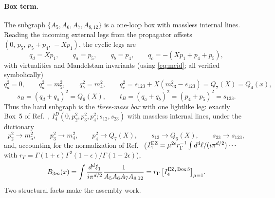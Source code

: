 \documentclass[11pt]{article}
\newcommand{\eps}{\epsilon}
\begin{document}
\paragraph{Box term.}
The subgraph $\{A_5,A_6,A_7,A_{8,12}\}$ is a one-loop box with massless internal lines. Reading
the incoming external legs from the propagator offsets $(0,\,p_5,\,p_5+p_4,\,-Xp_1)$, the cyclic
legs are
\begin{equation}
q_d=Xp_1,\qquad q_a=p_5,\qquad q_b=p_4,\qquad q_c=-(Xp_1+p_4+p_5),
\end{equation}
with virtualities and Mandelstam invariants (using \eqref{eq:mcid}; all verified symbolically)
\begin{equation}
q_d^2=0,\qquad q_a^2=m_5^2,\qquad q_b^2=m_4^2,\qquad
q_c^2=s_{123}+X(m_{23}^2-s_{123})=Q_7(X)=Q_4(x),
\end{equation}
\begin{equation}
s_B=(q_d+q_a)^2=Q_6(X),
\qquad
t_B=(q_a+q_b)^2=(p_4+p_5)^2=s_{123} .
\end{equation}
Thus the hard subgraph is the \emph{three-mass box} with one lightlike leg: exactly Box~5 of
Ref.~\cite{EZ}, $I_4^{D}(0,p_2^2,p_3^2,p_4^2;s_{12},s_{23})$ with massless internal lines, under
the dictionary
\begin{equation}
p_2^2\to m_5^2,\qquad p_3^2\to m_4^2,\qquad p_4^2\to Q_7(X),\qquad
s_{12}\to Q_6(X),\qquad s_{23}\to s_{123} ,
\label{eq:EZmap}
\end{equation}
and, accounting for the normalization of Ref.~\cite{EZ}
($I_4^{\rm EZ}=\mu^{2\eps}r_\Gamma^{-1}\int d^d\ell/(i\pi^{d/2})\cdots$ with
$r_\Gamma=\Gamma(1+\eps)\Gamma^2(1-\eps)/\Gamma(1-2\eps)$),
\begin{equation}
B_{3m}(x)=\int\frac{d^d\ell_1}{i\pi^{d/2}}\frac{1}{A_5A_6A_7A_{8,12}}
=r_\Gamma\,\big[I_4^{\rm EZ,\,Box\,5}\big]_{\mu=1} .
\end{equation}
Two structural facts make the assembly work.
\end{document}
